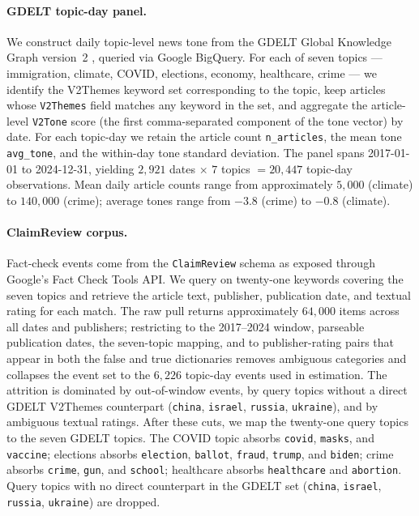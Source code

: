 \documentclass[12pt]{article}
\begin{document}
\paragraph{GDELT topic-day panel.}
We construct daily topic-level news tone from the GDELT Global Knowledge Graph version~2 \citep{leetaru2013gdelt}, queried via Google BigQuery. For each of seven topics --- immigration, climate, COVID, elections, economy, healthcare, crime --- we identify the V2Themes keyword set corresponding to the topic, keep articles whose \texttt{V2Themes} field matches any keyword in the set, and aggregate the article-level \texttt{V2Tone} score (the first comma-separated component of the tone vector) by date. For each topic-day we retain the article count \texttt{n\_articles}, the mean tone \texttt{avg\_tone}, and the within-day tone standard deviation. The panel spans 2017-01-01 to 2024-12-31, yielding $2{,}921$ dates $\times$ $7$ topics $=20{,}447$ topic-day observations. Mean daily article counts range from approximately $5{,}000$ (climate) to $140{,}000$ (crime); average tones range from $-3.8$ (crime) to $-0.8$ (climate).

\paragraph{ClaimReview corpus.}
Fact-check events come from the \texttt{ClaimReview} schema as exposed through Google's Fact Check Tools API. We query on twenty-one keywords covering the seven topics and retrieve the article text, publisher, publication date, and textual rating for each match. The raw pull returns approximately $64{,}000$ items across all dates and publishers; restricting to the 2017--2024 window, parseable publication dates, the seven-topic mapping, and to publisher-rating pairs that appear in both the false and true dictionaries removes ambiguous categories and collapses the event set to the $6{,}226$ topic-day events used in estimation. The attrition is dominated by out-of-window events, by query topics without a direct GDELT V2Themes counterpart (\texttt{china}, \texttt{israel}, \texttt{russia}, \texttt{ukraine}), and by ambiguous textual ratings. After these cuts, we map the twenty-one query topics to the seven GDELT topics. The COVID topic absorbs \texttt{covid}, \texttt{masks}, and \texttt{vaccine}; elections absorbs \texttt{election}, \texttt{ballot}, \texttt{fraud}, \texttt{trump}, and \texttt{biden}; crime absorbs \texttt{crime}, \texttt{gun}, and \texttt{school}; healthcare absorbs \texttt{healthcare} and \texttt{abortion}. Query topics with no direct counterpart in the GDELT set (\texttt{china}, \texttt{israel}, \texttt{russia}, \texttt{ukraine}) are dropped.
\end{document}
